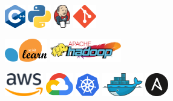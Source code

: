 {\centering
	
	\divider


}

\bigskip
{}

\bigskip
{}
{\centering
		\includegraphics[height=10mm]{img/cpp.png}
		\includegraphics[height=10mm]{img/python.png}
		\includegraphics[height=10mm]{img/jenkins.png}
		\includegraphics[height=10mm]{img/git.png}

		\divider

		\includegraphics[height=10mm]{img/scikit.png}
		\includegraphics[height=10mm]{img/hadoop.png}

}

\bigskip
{}
{\centering
	\includegraphics[height=10mm]{img/aws.png}
	\includegraphics[height=10mm]{img/gcp.png}
	\includegraphics[height=10mm]{img/kubernetes.png} 
	\includegraphics[height=10mm]{img/docker.png}
	\includegraphics[height=10mm]{img/ansible.png} 

	
}